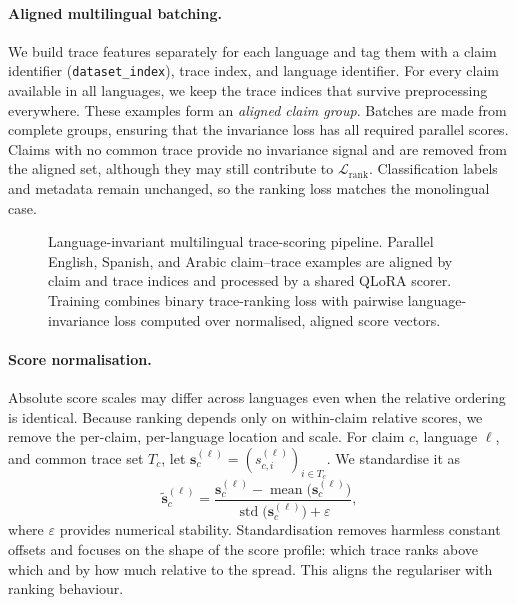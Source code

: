\paragraph{Aligned multilingual batching.}
We build trace features separately for each language and tag them with a claim identifier
(\texttt{dataset\_index}), trace index, and language identifier. For every claim available in all
languages, we keep the trace indices that survive preprocessing everywhere. These examples form an
\emph{aligned claim group}. Batches are made from complete groups, ensuring that the invariance loss
has all required parallel scores. Claims with no common trace provide no invariance signal and are
removed from the aligned set, although they may still contribute to $\mathcal{L}_{\text{rank}}$.
Classification labels and metadata remain unchanged, so the ranking loss matches the monolingual case.

\begin{figure}[htbp]
  \centering
  
\caption{Language-invariant multilingual trace-scoring pipeline. Parallel English, Spanish, and Arabic claim–trace examples are aligned by claim and trace indices and processed by a shared QLoRA scorer. Training combines binary trace-ranking loss with pairwise language-invariance loss computed over normalised, aligned score vectors.}
\label{fig:language-invariance}
\end{figure}

\paragraph{Score normalisation.}
Absolute score scales may differ across languages even when the relative ordering is identical.
Because ranking depends only on within-claim relative scores, we remove the per-claim, per-language
location and scale. For claim $c$, language $\ell$, and common trace set $T_c$, let
$\mathbf{s}^{(\ell)}_c=(s^{(\ell)}_{c,i})_{i\in T_c}$. We standardise it as
\begin{equation}
\label{eq:znorm}
\tilde{\mathbf{s}}^{(\ell)}_c=
\frac{\mathbf{s}^{(\ell)}_c-\operatorname{mean}\bigl(\mathbf{s}^{(\ell)}_c\bigr)}
     {\operatorname{std}\bigl(\mathbf{s}^{(\ell)}_c\bigr)+\varepsilon},
\end{equation}
where $\varepsilon$ provides numerical stability. Standardisation removes harmless constant offsets
and focuses on the shape of the score profile: which trace ranks above which and by how much relative
to the spread. This aligns the regulariser with ranking behaviour.

